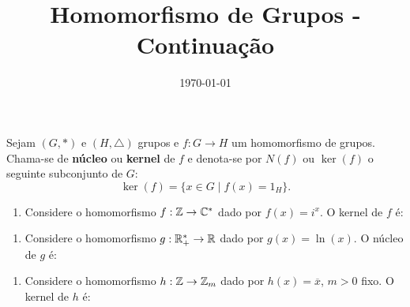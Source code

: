 \documentclass{beamer}
\title{Homomorfismo de Grupos - Continuação}
\author[\autor]{\autor}
\institute[\instituto]{\instituto}
\date{\today}
\begin{document}
    \begin{frame}
        \maketitle
    \end{frame}


    \begin{frame}
        \begin{definicao}
            Sejam $(G, *)$ e $(H, \triangle)$ grupos e $f : G \to H$ um homomorfismo de grupos. Chama-se de \textbf{n\'ucleo} ou \textbf{kernel} de $f$ e denota-se por $N(f)$ ou $\ker(f)$ o seguinte subconjunto de $G$:
            \[
                \ker(f) = \{x \in G \mid f(x) = 1_H\}.
            \]
        \end{definicao}
    \end{frame}

    \begin{frame}
        \begin{exemplos}
            \begin{enumerate}[label={\arabic*})]
                \item Considere o homomorfismo $f : \mathbb{Z} \to \mathbb{C}^*$ dado por $f(x) = i^x$. O kernel de $f$ é:
                \seti
            \end{enumerate}
        \end{exemplos}
    \end{frame}
    \begin{frame}
        \begin{exemplos}
            \begin{enumerate}[label={\arabic*})]
            \conti
                \item Considere o homomorfismo $g : \mathbb{R}^*_+ \to \mathbb{R}$ dado por $g(x) = \ln(x)$. O núcleo de $g$ é:
                \seti
            \end{enumerate}
        \end{exemplos}
    \end{frame}
    \begin{frame}
        \begin{exemplos}
            \begin{enumerate}[label={\arabic*})]
            \conti
                \item Considere o homomorfismo $h : \mathbb{Z} \to \mathbb{Z}_m$ dado por $h(x) = \overline{x}$, $m > 0$ fixo. O kernel de $h$ é:
            \end{enumerate}
        \end{exemplos}
    \end{frame}
\end{document}
